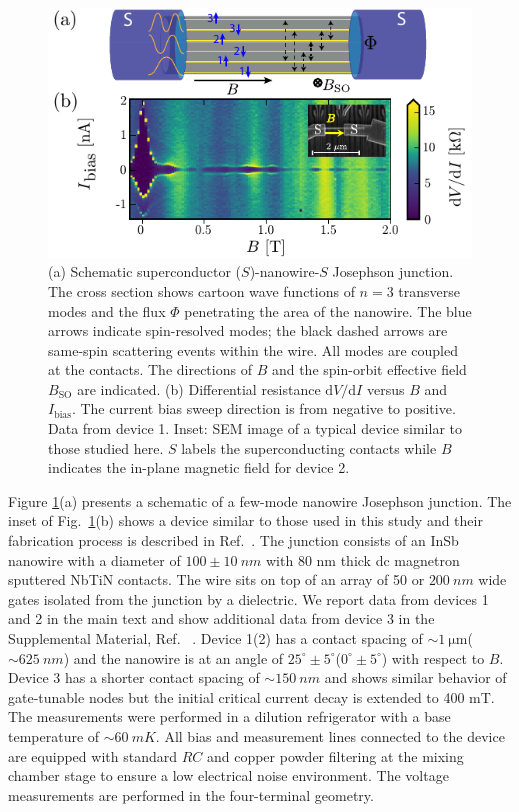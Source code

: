 \begin{figure}[ht]
\includegraphics[width=\columnwidth]{chapter_supercurrent/figures/fig1.pdf}
\caption{(a) Schematic superconductor ($S$)-nanowire-$S$ Josephson junction. The cross section shows cartoon wave functions of $n=3$ transverse modes and the flux $\Phi$ penetrating the area of the nanowire. The blue arrows indicate spin-resolved modes; the black dashed arrows are same-spin scattering events within the wire. All modes are coupled at the contacts. 
The directions of $B$ and the spin-orbit effective field $B_\mathrm{SO}$ are indicated. (b) Differential resistance $\mathrm{d}V/\mathrm{d}I$ versus $B$ and $I_\mathrm{bias}$.
The current bias sweep direction is from negative to positive. Data from device 1. Inset: SEM image of a typical device similar to those studied here. $S$ labels the superconducting contacts while $B$ indicates the in-plane magnetic field for device 2.}
\label{fig:figure1}
\end{figure}

Figure \ref{fig:figure1}(a) presents a schematic of a few-mode nanowire Josephson junction.
The inset of Fig.~\ref{fig:figure1}(b) shows a device similar to those used in this study and their fabrication process is described in Ref.~\cite{Mourik2012}.
The junction consists of an InSb nanowire with a diameter of $100 \pm \SI{10}{nm}$ with 80 nm thick dc magnetron sputtered NbTiN contacts.
The wire sits on top of an array of 50 or $\SI{200}{nm}$ wide gates isolated from the junction by a dielectric. 
We report data from devices 1 and 2 in the main text and show additional data from device 3 in the Supplemental Material, Ref. ~\cite{supp}.
Device 1(2) has a contact spacing of $\sim \SI{1}{\micro \m}$($\sim \SI{625}{nm}$) and the nanowire is at an angle of $25^\circ \pm 5^\circ$($0^\circ \pm 5^\circ$) with respect to $B$. 
Device 3 has a shorter contact spacing of $\sim \SI{150}{nm}$ and shows similar behavior of gate-tunable nodes but the initial critical current decay is extended to 400 mT.
The measurements were performed in a dilution refrigerator with a base temperature of $\sim\SI{60}{mK}$. 
All bias and measurement lines connected to the device are equipped with standard $RC$ and copper powder filtering at the mixing chamber stage to ensure a low electrical noise environment. 
The voltage measurements are performed in the four-terminal geometry.

